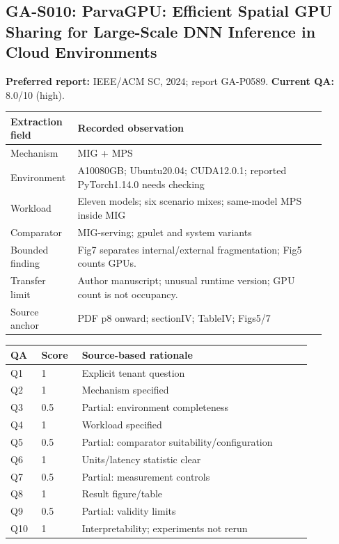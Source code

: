 \subsection{GA-S010: ParvaGPU: Efficient Spatial GPU Sharing for Large-Scale DNN Inference in Cloud Environments}
\textbf{Preferred report:} IEEE/ACM SC, 2024; report GA-P0589. \textbf{Current QA:} 8.0/10 (high).
\begin{longtable}{P{0.15\linewidth}P{0.75\linewidth}}
\toprule Extraction field & Recorded observation\\\midrule\endhead
Mechanism & MIG + MPS\\
Environment & A10080GB; Ubuntu20.04; CUDA12.0.1; reported PyTorch1.14.0 needs checking\\
Workload & Eleven models; six scenario mixes; same-model MPS inside MIG\\
Comparator & MIG-serving; gpulet and system variants\\
Bounded finding & Fig7 separates internal/external fragmentation; Fig5 counts GPUs.\\
Transfer limit & Author manuscript; unusual runtime version; GPU count is not occupancy.\\
Source anchor & PDF p8 onward; sectionIV; TableIV; Figs5/7\\
\bottomrule\end{longtable}
\begin{longtable}{P{0.09\linewidth}P{0.10\linewidth}P{0.67\linewidth}}
\toprule QA & Score & Source-based rationale\\\midrule\endhead
Q1 & 1 & Explicit tenant question\\
Q2 & 1 & Mechanism specified\\
Q3 & 0.5 & Partial: environment completeness\\
Q4 & 1 & Workload specified\\
Q5 & 0.5 & Partial: comparator suitability/configuration\\
Q6 & 1 & Units/latency statistic clear\\
Q7 & 0.5 & Partial: measurement controls\\
Q8 & 1 & Result figure/table\\
Q9 & 0.5 & Partial: validity limits\\
Q10 & 1 & Interpretability; experiments not rerun\\
\bottomrule\end{longtable}

